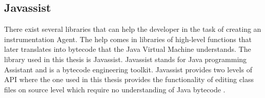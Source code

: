\subsection{Javassist}
There exist several libraries that can help the developer in the task of creating an instrumentation Agent. The help comes in libraries of high-level functions that later translates into bytecode that the Java Virtual Machine understands. The library used in this thesis is Javassist. Javassist stands for Java programming Assistant and is a bytecode engineering toolkit. Javassist provides two levels of API where the one used in this thesis provides the functionality of editing class files on source level which require no understanding of Java bytecode \parencite{Javassist}.